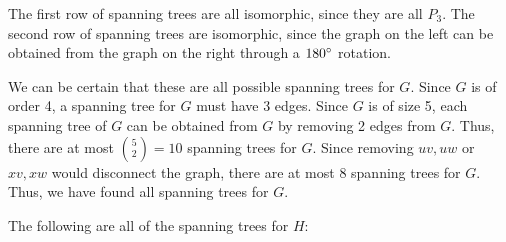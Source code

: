 \documentclass[12pt]{article}
\begin{document}
    The first row of spanning trees are all isomorphic, since they are all $P_3$.
    The second row of spanning trees are isomorphic, since the graph on the left can be obtained from the graph on the right through a $180\degree$ rotation.

    We can be certain that these are all possible spanning trees for $G$.
    Since $G$ is of order 4, a spanning tree for $G$ must have 3 edges.
    Since $G$ is of size 5, each spanning tree of $G$ can be obtained from $G$ by removing 2 edges from $G$.
    Thus, there are at most ${5 \choose 2} = 10$ spanning trees for $G$.
    Since removing $uv,uw$ or $xv,xw$ would disconnect the graph, there are at most 8 spanning trees for $G$.
    Thus, we have found all spanning trees for $G$.

    \newpage
    The following are all of the spanning trees for $H$:
\end{document}
